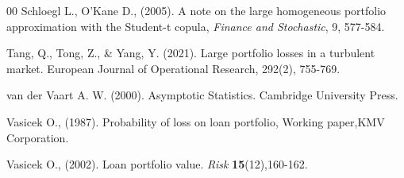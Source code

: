 \documentclass[preprint,12pt]{article}
\begin{document}
\begin{thebibliography}{00}
 Schloegl L., O'Kane D., (2005). A note on the large homogeneous portfolio approximation with the Student-t copula, \emph{Finance and Stochastic}, 9, 577-584.

 Tang, Q., Tong, Z., \& Yang, Y. (2021). Large portfolio losses in a turbulent market. European Journal of Operational Research, 292(2), 755-769.

 van der Vaart A. W. (2000). Asymptotic Statistics. Cambridge University Press.

  Vasicek O., (1987). Probability of loss on loan portfolio, Working paper,KMV Corporation.

  Vasicek O., (2002). Loan portfolio value. \emph{Risk} {\bf{15}}(12),160-162.
\end{thebibliography}
\end{document}
